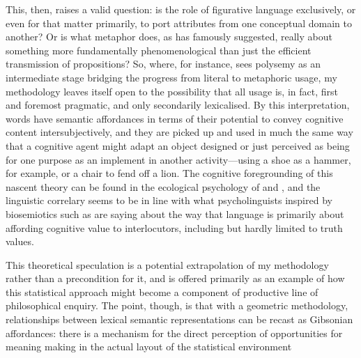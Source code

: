 This, then, raises a valid question: is the role of figurative language exclusively, or even for that matter primarily, to port attributes from one conceptual domain to another?  Or is what metaphor does, as \cite{Davidson} has famously suggested, really about something more fundamentally phenomenological than just the efficient transmission of propositions?  So, where, for instance, \cite{Sweetser} sees polysemy as an intermediate stage bridging the progress from literal to metaphoric usage, my methodology leaves itself open to the possibility that all usage is, in fact, first and foremost pragmatic, and only secondarily lexicalised.  By this interpretation, words have semantic affordances in terms of their potential to convey cognitive content intersubjectively, and they are picked up and used in much the same way that a cognitive agent might adapt an object designed or just perceived as being for one purpose as an implement in another activity---using a shoe as a hammer, for example, or a chair to fend off a lion.  The cognitive foregrounding of this nascent theory can be found in the ecological psychology of \cite{Gibson} and \cite{Bateson}, and the linguistic correlary seems to be in line with what psycholinguists inspired by biosemiotics such as \cite{Raczsek} are saying about the way that language is primarily about affording cognitive value to interlocutors, including but hardly limited to truth values.

This theoretical speculation is a potential extrapolation of my methodology rather than a precondition for it, and is offered primarily as an example of how this statistical approach might become a component of productive line of philosophical enquiry.  The point, though, is that with a geometric methodology, relationships between lexical semantic representations can be recast as Gibsonian affordances: there is a mechanism for the direct perception of opportunities for meaning making in the actual layout of the statistical environment

